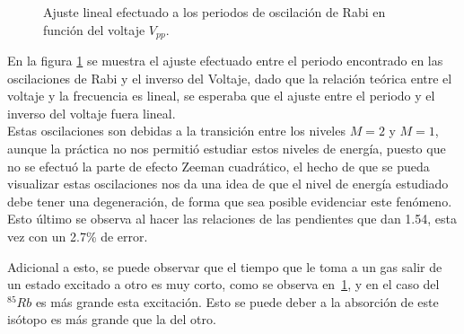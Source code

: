 \documentclass[%
 reprint,
 amsmath,amssymb,
 aps,
]{revtex4-1}
\begin{document}
\begin{figure}[h]
\caption{\label{Volt_periodo} Ajuste lineal efectuado a los periodos de oscilación de Rabi en función del voltaje $V_{pp}$.}
\end{figure}
En la figura \ref{Volt_periodo} se muestra el ajuste efectuado entre el periodo encontrado en las oscilaciones de Rabi y el inverso del Voltaje, dado que la relación teórica entre el voltaje y la frecuencia es lineal\cite{teoria de rabi}, se esperaba que el ajuste entre el periodo y el inverso del voltaje fuera lineal.\\
Estas oscilaciones son debidas a la transición entre los niveles $M=2$ y $M=1$, aunque la práctica no nos permitió estudiar estos niveles de energía, puesto que no se efectuó la parte de efecto Zeeman cuadrático, el hecho de que se pueda visualizar estas oscilaciones nos da una idea de que el nivel de energía estudiado debe tener una degeneración, de forma que sea posible evidenciar este fenómeno. Esto último se observa al hacer las relaciones de las pendientes que dan 1.54, esta vez con un 2.7\% de error. 

Adicional a esto, se puede observar que el tiempo que le toma a un gas salir de un estado excitado a otro es muy corto, como se observa en~\ref{Volt_periodo}, y en el caso del $^{85}Rb$ es más grande esta excitación. Esto se puede deber a la absorción de este isótopo es más grande que la del otro.
\end{document}
